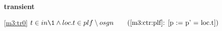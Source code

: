 \textbf{transient}
\begin{block}
\item[ \eqref{m3:tr0} ]$t \in in  %
			\1\land loc.t \in plf \setminus osgn  \qquad \text{(\ref{m3:ctr:plf}: [p := p' = loc.t])}$ %
\end{block}
